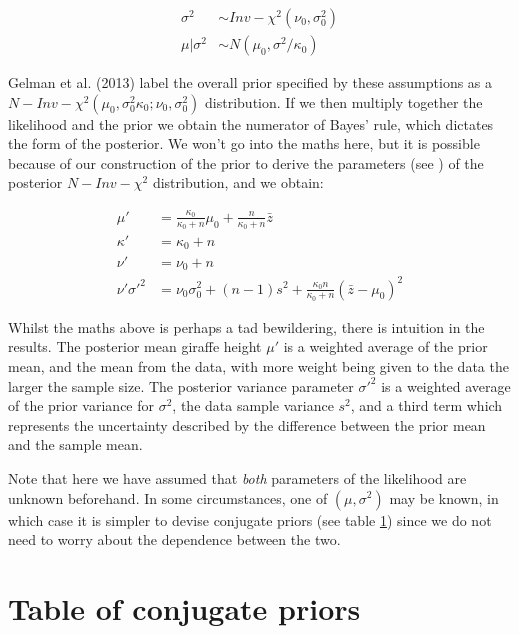 \documentclass[11pt,fullpage]{book}
\begin{document}
\begin{align}
\sigma^2 &\sim Inv-\chi^2(\nu_0,\sigma_0^2)\\
\mu|\sigma^2 &\sim N(\mu_0,\sigma^2/\kappa_0)
\end{align}

Gelman et al. (2013) label the overall prior specified by these assumptions as a $N-Inv-\chi^2(\mu_0,\sigma_0^2\kappa_0;\nu_0,\sigma_0^2)$ distribution. If we then multiply together the likelihood and the prior we obtain the numerator of Bayes' rule, which dictates the form of the posterior. We won't go into the maths here, but it is possible because of our construction of the prior to derive the parameters (see \cite{gelman2013bayesian}) of the posterior $N-Inv-\chi^2$ distribution, and we obtain:

\begin{align}
\mu' &= \frac{\kappa_0}{\kappa_0 + n}\mu_0 + \frac{n}{\kappa_0 + n} \bar{z}\\
\kappa' &= \kappa_0 + n\\
\nu' &= \nu_0 + n\\
\nu' \sigma'^2 &= \nu_0 \sigma_0^2 + (n-1)s^2 + \frac{\kappa_0 n}{\kappa_0 + n}(\bar{z} - \mu_0)^2
\end{align}

Whilst the maths above is perhaps a tad bewildering, there is intuition in the results. The posterior mean giraffe height $\mu'$ is a weighted average of the prior mean, and the mean from the data, with more weight being given to the data the larger the sample size. The posterior variance parameter $\sigma'^2$ is a weighted average of the prior variance for $\sigma^2$, the data sample variance $s^2$, and a third term which represents the uncertainty described by the difference between the prior mean and the sample mean.

Note that here we have assumed that \textit{both} parameters of the likelihood are unknown beforehand. In some circumstances, one of $(\mu,\sigma^2)$ may be known, in which case it is simpler to devise conjugate priors (see table \ref{sec:Conjugate_tableConjugatePriors}) since we do not need to worry about the dependence between the two. 

\section{Table of conjugate priors}\label{sec:Conjugate_tableConjugatePriors}
\end{document}
